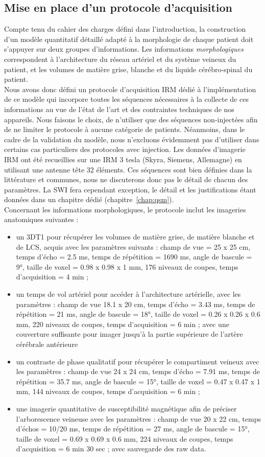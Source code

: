 \subsection{Mise en place d'un protocole d'acquisition}
Compte tenu du cahier des charges défini dans l’introduction, la construction d’un modèle quantitatif détaillé adapté à la morphologie de chaque patient doit s’appuyer sur deux groupes d’informations. Les informations {\em morphologiques} correspondent à l’architecture du réseau artériel et du système veineux du patient, et les volumes de matière grise, blanche et du liquide cérébro-spinal du patient.\\
Nous avons donc défini un protocole d’acquisition IRM dédié à l’implémentation de ce modèle qui incorpore toutes les séquences nécessaires à la collecte de ces informations au vue de l’état de l’art et des contraintes techniques de nos appareils. Nous faisons le choix, de n’utiliser que des séquences non-injectées afin de ne limiter le protocole à aucune catégorie de patients. Néanmoins, dans le cadre de la validation du modèle,  nous n’excluons évidemment pas d’utiliser dans certains cas particuliers des protocoles avec injection. Les données d’imagerie IRM ont été recueillies sur une IRM 3 tesla (Skyra, Siemens, Allemagne) en utilisant une antenne tête 32 éléments. Ces séquences sont bien définies dans la littérature et communes, nous ne discuterons donc pas le détail de chacun des paramètres. La SWI fera cependant exception, le détail et les justifications étant données dans un chapitre dédié (chapitre~\ref{chap:qsm}).\\
Concernant les informations morphologiques, le protocole inclut les imageries anatomiques suivantes :
\begin{itemize}
\item un 3DT1 pour récupérer les volumes de matière grise, de matière blanche et de LCS, acquis avec les paramètres suivants : champ de vue = 25 x 25 cm, temps d’écho = 2.5 ms, temps de répétition = 1690 ms, angle de bascule = 9°, taille de voxel = 0.98 x 0.98 x 1 mm, 176 niveaux de coupes, temps d'acquisition = 4 min ;
\item un temps de vol artériel pour accéder à l’architecture artérielle, avec les paramètres : champ de vue 18.1 x 20 cm, temps d’écho = 3.43 ms, temps de répétition = 21 ms, angle de bascule = 18°, taille de voxel = 0.26 x 0.26 x 0.6 mm, 220 niveaux de coupes,  temps d'acquisition = 6 min ; avec une couverture suffisante pour imager jusqu’à la partie supérieure de l’artère cérébrale antérieure
\item un contraste de phase qualitatif pour récupérer le compartiment veineux avec les paramètres : champ de vue 24 x 24 cm, temps d’écho = 7.91 ms, temps de répétition = 35.7 ms, angle de bascule = 15°, taille de voxel = 0.47 x 0.47 x 1 mm, 144 niveaux de coupes,  temps d'acquisition = 6 min ;
\item une imagerie quantitative de susceptibilité magnétique afin de préciser l’arborescence veineuse avec les paramètres : champ de vue 20 x 22 cm, temps d’échos = 10/20 ms, temps de répétition = 27 ms, angle de bascule = 15°, taille de voxel = 0.69 x 0.69 x 0.6 mm, 224 niveaux de coupes,  temps d'acquisition = 6 min 30 sec ; avec sauvegarde des raw data.
\end{itemize}
